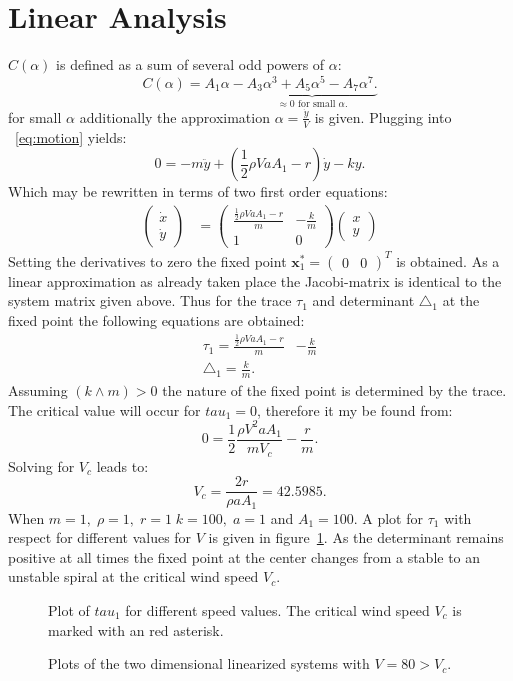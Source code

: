 \section{Linear Analysis}
$C(\alpha)$ is defined as a sum of several odd powers of $\alpha$:
\begin{equation}
C(\alpha) = A_1 \alpha - \underbrace{ A_3 \alpha^3 + A_ 5 \alpha ^5 - A_7 \alpha^7.}_\text{$\approx 0$ for small $\alpha$.} 
\end{equation}
for small $\alpha$ additionally the approximation $\alpha = \frac{\dot{y}}{V}$ is given. Plugging into ~\ref{eq:motion} yields:
\begin{equation}
0 = -m \ddot{y} + (\frac{1}{2}\rho V a A_1 -  r)\dot{y} - ky. 
\end{equation}
Which may be rewritten in terms of two first order equations:
\begin{align}
\begin{pmatrix}
\dot{x} \\ \dot{y} \end{pmatrix} &=
\begin{pmatrix}
	\frac{\frac{1}{2}\rho V a A_1 -  r}{m} & - \frac{k}{m}  \\ 
	1 & 0
\end{pmatrix} 
\begin{pmatrix}
x \\ y
\end{pmatrix}
\end{align}
Setting the derivatives to zero the fixed point $\mathbf{x}_1^* = \begin{pmatrix} 0 & 0 \end{pmatrix}^T$ is obtained. As a linear approximation as already taken place the Jacobi-matrix is identical to the system matrix given above. Thus for the trace $\tau_1$ and determinant $\triangle_1$ at the fixed point the following equations are obtained:
\begin{align}
\tau_1 = \frac{\frac{1}{2}\rho V a A_1 -  r}{m} & - \frac{k}{m} \\
\triangle_1 = \frac{k}{m}.
\end{align}
Assuming $(k \wedge m) > 0$ the nature of the fixed point is determined by the trace. The critical value will occur for $tau_1 = 0$, therefore it my be found from:
\begin{equation}
0 = \frac{1}{2} \frac{\rho V^2 a A_1}{mV_c} - \frac{r}{m}.
\end{equation}
Solving for $V_c$ leads to:
\begin{equation}
V_c = \frac{2r}{\rho a A_1} = 42.5985.
\end{equation}
When $m = 1, \; \rho = 1, \; r = 1 \; k = 100, \; a = 1$ and $A_1 = 100$. 
A plot for $\tau_1$ with respect for different values for $V$ is given in figure~\ref{fig:tau1}. As the determinant remains positive at all times the fixed point at the center changes from a stable to an unstable spiral at the critical wind speed $V_c$. 
\begin{figure}

\caption{Plot of $tau_1$ for different speed values. The critical wind speed $V_c$ is marked with an red asterisk.}
\label{fig:tau1}
\end{figure}

\begin{figure}
%
%

\caption{Plots of the two dimensional linearized systems with $V = 80 > V_c$.}
\end{figure}


